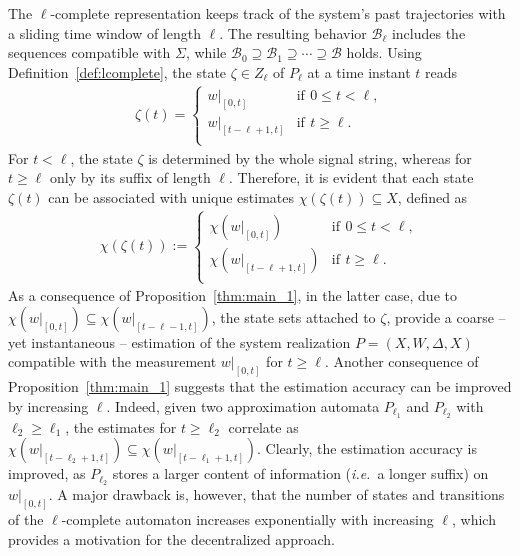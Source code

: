 \documentclass[a4paper, 10pt, conference]{ieeeconf}
\newcommand{\ie}{\emph{i.e.}}
\begin{document}
The $\ell$-complete representation keeps track of the system's past trajectories with a sliding time window of length $\ell$. The resulting behavior $\mathcal{B}_\ell$ includes the sequences compatible with  $\Sigma$, while $\mathcal{B}_0\supseteq \mathcal{B}_1\supseteq \cdots \supseteq\mathcal{B}$ holds. Using Definition~\ref{def:lcomplete}, the state $\zeta \in Z_\ell$ of $P_\ell$ at a time instant $t$ reads
\begin{align}\label{eq:zeta_mon}
   \zeta(t)=\left\{\begin{array}{ll}w|_{[0,t]} &\text{if}~\, 0\leq t< \ell,\\ w|_{[t-\ell+1,t]} &\text{if}~\, t\geq \ell.\\   \end{array} \right.
\end{align}
For $t< \ell$, the state $\zeta$ is determined by the whole signal string, whereas for $t\geq\ell$ only by its suffix of length $\ell$. Therefore, it is evident that each state $\zeta(t)$ can be associated with unique estimates $\chi(\zeta(t))\subseteq X$, defined as
\begin{align}
   \chi(\zeta(t)):=\left\{\begin{array}{ll} \chi(w|_{[0,t]}) &\text{if}~\, 0\leq t< \ell,\\ \chi(w|_{[t-\ell+1,t]}) &\text{if}~\, t\geq \ell.\\   \end{array} \right.
\end{align}
As a consequence of Proposition~\ref{thm:main_1}, in the latter case, due to $\chi(w|_{[0,t]})\subseteq \chi(w|_{[t-\ell-1,t]})$,
the state sets attached to $\zeta$, provide a coarse -- yet instantaneous -- estimation of the system realization $P=(X,W,\Delta,X)$ compatible with the measurement $w|_{[0,t]}$ for $t\geq \ell$. Another consequence of Proposition~\ref{thm:main_1} suggests that the estimation accuracy can be improved by increasing $\ell$. Indeed, given two approximation automata $P_{\ell_1}$ and $P_{\ell_2}$  with $\ell_2\geq \ell_1$, the estimates for $t \geq \ell_2$ correlate as $\chi(w|_{[t-\ell_2+1,t]}) \subseteq \chi(w|_{[t-\ell_1+1,t]})$.
Clearly, the estimation accuracy is improved, as $P_{\ell_2}$ stores a larger content of information (\ie\, a longer suffix) on $w|_{[0,t]}$. A major drawback is, however, that the number of states and transitions of the $\ell$-complete automaton increases exponentially with increasing  $\ell$, which provides a motivation for the decentralized approach.
\end{document}
